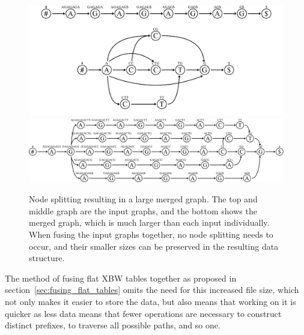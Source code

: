\documentclass[a4paper,12pt,twoside,BCOR=10mm]{scrbook}
\begin{document}
\begin{figure}[!htb]
\centering
\includegraphics[width=\textwidth]{evo_fig_massive_split.pdf}
\includegraphics[width=\textwidth]{evo_fig_massive_split_3.pdf}
\caption[Node splitting resulting in large merged graph]{Node splitting resulting in a large merged graph. The top and middle graph are the input graphs, and the bottom shows the merged graph, which is much larger than each input individually. When fusing the input graphs together, no node splitting needs to occur, and their smaller sizes can be preserved in the resulting data structure.} \label{fig:evo_fig_massive_split}
\end{figure}

The method of fusing flat XBW tables together as proposed in section~\ref{sec:fusing_flat_tables} omits 
the need for this increased file size, 
which not only makes it easier to store the data, but also means that working on 
it is quicker as less data means that fewer operations are necessary to construct 
distinct prefixes, to traverse all possible paths, and so one.
\end{document}
